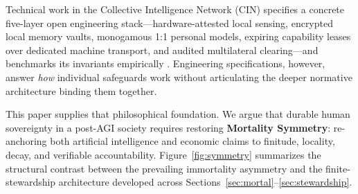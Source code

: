 \documentclass[11pt]{article}
\begin{document}
Technical work in the Collective Intelligence Network (CIN) specifies a concrete five-layer open engineering stack---hardware-attested local sensing, encrypted local memory vaults, monogamous 1:1 personal models, expiring capability leases over dedicated machine transport, and audited multilateral clearing---and benchmarks its invariants empirically \citep{baker2026cin}. Engineering specifications, however, answer \emph{how} individual safeguards work without articulating the deeper normative architecture binding them together.

This paper supplies that philosophical foundation. We argue that durable human sovereignty in a post-AGI society requires restoring \textbf{Mortality Symmetry}: re-anchoring both artificial intelligence and economic claims to finitude, locality, decay, and verifiable accountability. Figure~\ref{fig:symmetry} summarizes the structural contrast between the prevailing immortality asymmetry and the finite-stewardship architecture developed across Sections~\ref{sec:mortal}--\ref{sec:stewardship}.
\end{document}
